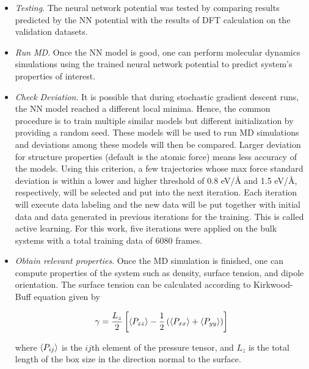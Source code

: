 \begin{itemize}
    \item \emph{Testing}. The neural network potential was tested by
          comparing results predicted by the NN potential with	  the results
          of DFT
          calculation on the validation datasets.

    \item \emph{Run MD}. Once the NN model is good, one can perform molecular
          dynamics simulations using the trained neural   network potential to
          predict
          system's properties of interest.

    \item \emph{Check Deviation}. It is possible that during stochastic
          gradient descent runs, the NN model reached a different local minima.
          Hence,
          the common procedure is to train multiple similar models but
          different
          initialization by providing a  random seed. These models will be used
          to run MD simulations and deviations among these models will then be
          compared. Larger deviation for structure properties (default is the
          atomic
          force) means less accuracy of the models. Using this criterion, a few
          trajectories whose max force standard deviation is within a lower and
          higher
          threshold of 0.8 \unit{eV/\angstrom} and 1.5	\unit{eV/\angstrom},
          respectively,
          will be selected and put into the next iteration. Each iteration will
          execute data labeling  and  the new data will be put together with
          initial data
          and data generated in previous iterations for the training. This is
          called active learning. For this work, five iterations were applied
          on
          the bulk
          systems with a total training data of 6080 frames.

    \item \emph{Obtain relevant properties}. Once the MD
          simulation is
          finished, one can compute properties of the system such as density,
          surface
          tension, and dipole orientation.	    The surface tension can be
          calculated according to Kirkwood-Buff
          equation
          \cite{kirkwood1949} given by

          \begin{equation}
              \gamma = \frac{L_z}{2} \left[ \expval{P_{zz}} -\frac{1}{2} \left(
                  \expval{P_{xx}} + \expval{P_{yy}} \right) \right]
              \label{eq:surf_tens}
          \end{equation}

          where $\expval{P_{ij}}$ is the $ij$th element of the pressure tensor,
          and $L_z$ is the total length of the box size in the direction normal
          to the
          surface.

\end{itemize}
